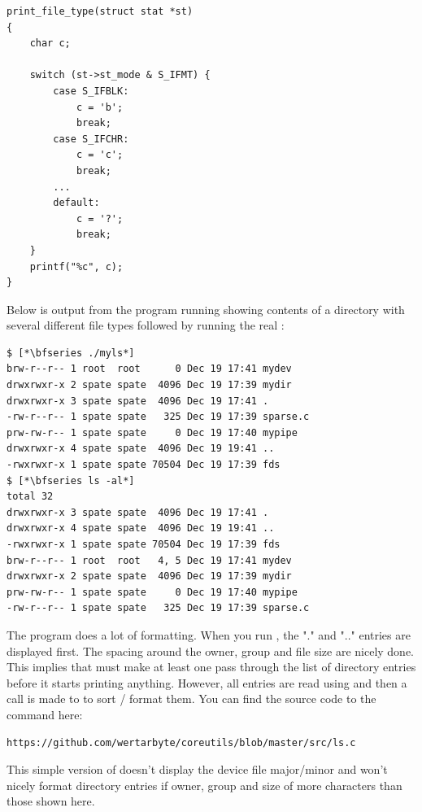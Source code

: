 \begin{lstlisting}
print_file_type(struct stat *st)
{
    char c;

    switch (st->st_mode & S_IFMT) {
        case S_IFBLK:
            c = 'b';
            break;
        case S_IFCHR:
            c = 'c';
            break;
        ...
        default:
            c = '?';
            break;
    }
    printf("%c", c);
}
\end{lstlisting}

\noindent
Below is output from the program running showing contents of a directory with several different file types followed by running the real :

\begin{lstlisting}
$ [*\bfseries ./myls*]
brw-r--r-- 1 root  root      0 Dec 19 17:41 mydev
drwxrwxr-x 2 spate spate  4096 Dec 19 17:39 mydir
drwxrwxr-x 3 spate spate  4096 Dec 19 17:41 .
-rw-r--r-- 1 spate spate   325 Dec 19 17:39 sparse.c
prw-rw-r-- 1 spate spate     0 Dec 19 17:40 mypipe
drwxrwxr-x 4 spate spate  4096 Dec 19 19:41 ..
-rwxrwxr-x 1 spate spate 70504 Dec 19 17:39 fds
$ [*\bfseries ls -al*]
total 32
drwxrwxr-x 3 spate spate  4096 Dec 19 17:41 .
drwxrwxr-x 4 spate spate  4096 Dec 19 19:41 ..
-rwxrwxr-x 1 spate spate 70504 Dec 19 17:39 fds
brw-r--r-- 1 root  root   4, 5 Dec 19 17:41 mydev
drwxrwxr-x 2 spate spate  4096 Dec 19 17:39 mydir
prw-rw-r-- 1 spate spate     0 Dec 19 17:40 mypipe
-rw-r--r-- 1 spate spate   325 Dec 19 17:39 sparse.c
\end{lstlisting}

\noindent
The  program does a lot of formatting. When you run , the "." and ".." entries are displayed first. The spacing around the owner, group and file size are nicely done. This implies that  must make at least one pass through the list of directory entries before it starts printing anything. However, all entries are read using  and then a call is made to  to sort / format them. You can find the source code to the  command here:

\begin{lstlisting}
https://github.com/wertarbyte/coreutils/blob/master/src/ls.c
\end{lstlisting}

\noindent
This simple version of  doesn't display the device file major/minor and won't nicely format directory entries if owner, group and size of more characters than those shown here.

